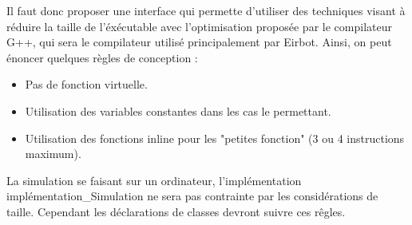 Il faut donc proposer une interface qui permette d'utiliser des techniques visant à réduire la taille de l'éxécutable avec l'optimisation proposée par le compilateur G++, qui sera le compilateur utilisé principalement par Eirbot. Ainsi, on peut énoncer quelques règles de conception :
\begin{itemize}
    \item{Pas de fonction virtuelle.}
    \item{Utilisation des variables constantes dans les cas le permettant.}
    \item{Utilisation des fonctions inline pour les "petites fonction" (3 ou 4 instructions maximum).}
\end{itemize}

La simulation se faisant sur un ordinateur, l'implémentation implémentation\_Simulation ne sera pas contrainte par les considérations de taille. Cependant les déclarations de classes devront suivre ces rêgles.


